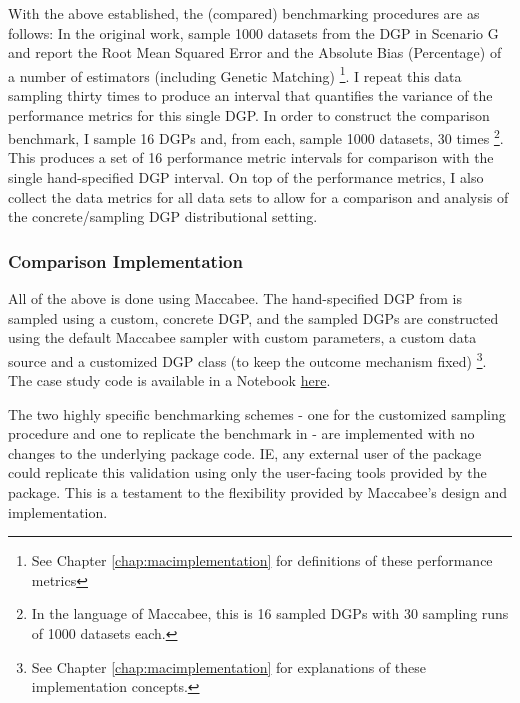 \documentclass[../main.tex]{subfiles}
\begin{document}
\vspace{\baselineskip}

With the above established, the (compared) benchmarking procedures are as follows: In the original work, \citeauthor{Diamond2013GeneticStudies} sample 1000 datasets from the DGP in Scenario G and report the Root Mean Squared Error and the Absolute Bias (Percentage) of a number of estimators (including Genetic Matching) \footnote{See Chapter \ref{chap:macimplementation} for definitions of these performance metrics}. I repeat this data sampling thirty times to produce an interval that quantifies the variance of the performance metrics for this single DGP. In order to construct the comparison benchmark, I sample 16 DGPs and, from each, sample 1000 datasets, 30 times \footnote{In the language of Maccabee, this is 16 sampled DGPs with 30 sampling runs of 1000 datasets each.}. This produces a set of 16 performance metric intervals for comparison with the single hand-specified DGP interval. On top of the performance metrics, I also collect the data metrics for all data sets to allow for a comparison and analysis of the concrete/sampling DGP distributional setting.

\subsubsection{Comparison Implementation}

All of the above is done using Maccabee. The hand-specified DGP from \textcite{Diamond2013GeneticStudies} is sampled using a custom, concrete DGP, and the sampled DGPs are constructed using the default Maccabee sampler with custom parameters, a custom data source and a customized DGP class (to keep the outcome mechanism fixed) \footnote{See Chapter \ref{chap:macimplementation} for explanations of these implementation concepts.}. The case study code is available in a Notebook \href{https://github.com/JoshBroomberg/Maccabee/blob/master/Notebooks/Genmatch\%20Benchmark\%20Validation.ipynb}{here}. 

\vspace{\baselineskip}

The two highly specific benchmarking schemes - one for the customized sampling procedure and one to replicate the benchmark in \textcite{Diamond2013GeneticStudies} - are implemented with no changes to the underlying package code. IE, any external user of the package could replicate this validation using only the user-facing tools provided by the package. This is a testament to the flexibility provided by Maccabee's design and implementation.
\end{document}
